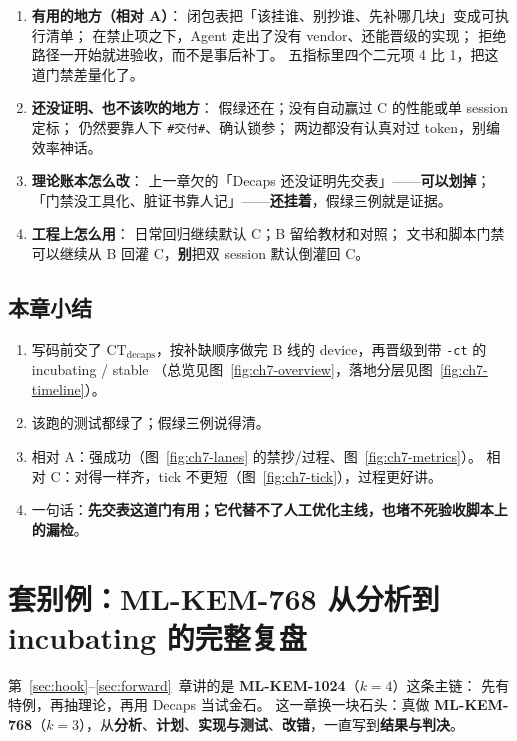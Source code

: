 \documentclass[UTF8,a4paper,11pt]{ctexart}
\theoremstyle{definition}
\theoremstyle{plain}
\theoremstyle{remark}
\numberwithin{figure}{section}
\numberwithin{table}{section}
\begin{document}
\begin{enumerate}
  \item \textbf{有用的地方（相对 A）}：
        闭包表把「该挂谁、别抄谁、先补哪几块」变成可执行清单；
        在禁止项之下，Agent 走出了没有 vendor、还能晋级的实现；
        拒绝路径一开始就进验收，而不是事后补丁。
        五指标里四个二元项 4 比 1，把这道门禁差量化了。
  \item \textbf{还没证明、也不该吹的地方}：
        假绿还在；没有自动赢过 C 的性能或单 session 定标；
        仍然要靠人下 \texttt{\#交付\#}、确认锁参；
        两边都没有认真对过 token，别编效率神话。
  \item \textbf{理论账本怎么改}：
        上一章欠的「Decaps 还没证明先交表」——\textbf{可以划掉}；
        「门禁没工具化、脏证书靠人记」——\textbf{还挂着}，假绿三例就是证据。
  \item \textbf{工程上怎么用}：
        日常回归继续默认 C；B 留给教材和对照；
        文书和脚本门禁可以继续从 B 回灌 C，\textbf{别}把双 session 默认倒灌回 C。
\end{enumerate}

\subsection{本章小结}
\label{sec:forward-summary}

\begin{enumerate}
  \item 写码前交了 $\mathrm{CT}_{\mathrm{decaps}}$，按补缺顺序做完 B 线的 device，再晋级到带 \texttt{-ct} 的 incubating / stable
        （总览见图~\ref{fig:ch7-overview}，落地分层见图~\ref{fig:ch7-timeline}）。
  \item 该跑的测试都绿了；假绿三例说得清。
  \item 相对 A：强成功（图~\ref{fig:ch7-lanes} 的禁抄/过程、图~\ref{fig:ch7-metrics}）。
        相对 C：对得一样齐，tick 不更短（图~\ref{fig:ch7-tick}），过程更好讲。
  \item 一句话：\textbf{先交表这道门有用；它代替不了人工优化主线，也堵不死验收脚本上的漏检}。
\end{enumerate}



\section{套别例：ML-KEM-768 从分析到 incubating 的完整复盘}
\label{sec:mlkem768}

第~\ref{sec:hook}--\ref{sec:forward}~章讲的是 \textbf{ML-KEM-1024}（$k=4$）这条主链：
先有特例，再抽理论，再用 Decaps 当试金石。
这一章换一块石头：真做 \textbf{ML-KEM-768}（$k=3$），从\textbf{分析}、\textbf{计划}、\textbf{实现与测试}、\textbf{改错}，一直写到\textbf{结果与判决}。
\end{document}
